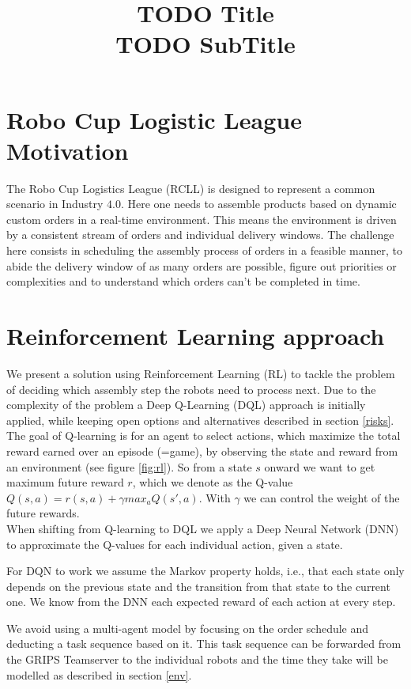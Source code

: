 \documentclass[runningheads,envcountsect]{llncs}
\title{{\huge TODO Title}\\{\LARGE \vspace{4pt} TODO SubTitle}}
\author{}
\institute{}
\begin{document}
\maketitle

\section{Robo Cup Logistic League Motivation}
The Robo Cup Logistics League (RCLL) is designed to represent a common scenario in Industry $4.0$. Here one needs to assemble products based on dynamic custom orders in a real-time environment. This means the environment is driven by a consistent stream of orders and individual delivery windows. The challenge here consists in scheduling the assembly process of orders in a feasible manner, to abide the delivery window of as many orders are possible, figure out priorities or complexities and to understand which orders can't be completed in time.

\section{Reinforcement Learning approach}
We present a solution using Reinforcement Learning (RL) to tackle the problem of deciding which assembly step the robots need to process next. Due to the complexity of the problem a Deep Q-Learning (DQL) approach is initially applied, while keeping open options and alternatives described in section \ref{risks}.\\
The goal of Q-learning is for an agent to select actions, which maximize the total reward earned over an episode (=game), by observing the state and reward from an environment (see figure \ref{fig:rl}). So from a state $s$ onward we want to get maximum future reward $r$, which we denote as the Q-value $Q(s,a)=r(s,a)+\gamma max_a Q(s',a)$. With $\gamma$ we can control the weight of the future rewards.\\
When shifting from Q-learning to DQL we apply a Deep Neural Network (DNN) to approximate the Q-values for each individual action, given a state.

For DQN to work we assume the Markov property holds, i.e., that each state only depends on the previous state and the transition from that state to the current one.
We know from the DNN each expected reward of each action at every step.

We avoid using a multi-agent model by focusing on the order schedule and deducting a task sequence based on it. This task sequence can be forwarded from the GRIPS Teamserver to the individual robots and the time they take will be modelled as described in section \ref{env}.
\end{document}
